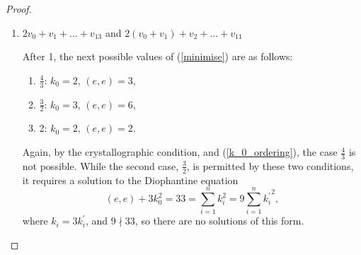 \documentclass[smallcondensed]{svjour3}                     %
\begin{document}
\begin{proof}
\begin{enumerate}
By the crystallographic condition, and (\ref{k_0_ordering}), the cases $\frac{1}{3}$ and $\frac{2}{3}$ are not possible. The second case, $\frac{1}{2}$, is realised by a solution to the Diophantine equation
\[(e, e) + 3 k_0^2 = 5 = \sum_{i=1}^n k_i^2,\]
where, by (\ref{k_0_ordering}) and (\ref{k_i_ordering}), all the $k_i$ must be bounded above by 1. Therefore this equation only has solutions in 5 or more dimensions, and produces
\begin{equation}\label{5dimensions}
v_0 + v_1 + v_2 + v_3 + v_4 + v_5.
\end{equation}

Now consider the final case in this list. This is realised by a solution to the Diophantine equation
\[(e, e) + 3 k_0^2 = 4 = \sum_{i=1}^n k_i^2,\]
where again, by (\ref{k_0_ordering}) and (\ref{k_i_ordering}), all the $k_i$ must be bounded above by 1. Therefore this equation has solutions in 4 or more dimensions, and produces
\begin{equation}\label{4dimensions}
v_0 + v_1 + v_2 + v_3 + v_4.
\end{equation}

A new vector is required in 4 dimensions to define an acute angled polyhedron of finite volume, and the vector (\ref{4dimensions}) is sufficient. In 5 or more dimensions the new vector must be taken to be (\ref{5dimensions}), as it has a smaller value of (\ref{minimise}). Note that as the inner product of (\ref{5dimensions}) and (\ref{4dimensions}) is positive, the two vectors are not mutually admissable.

In 5 or more dimensions, the additional constraint coming from $v_0 + v_1 + v_2 + v_3 + v_4 + v_5$ is:
\begin{equation} \label{3k_0gesum}
3 k_0 \ge k_1 + k_2 + k_3 + k_4 + k_5.
\end{equation}

\item $2 v_0 + v_1 + \ldots + v_{13}$ and $2( v_0 + v_1) + v_2 + \ldots + v_{11}$

After 1, the next possible values of (\ref{minimise}) are as follows:
\begin{enumerate}
\item $\frac{4}{3}$: $k_0 = 2$, $(e, e) = 3$, 
\item $\frac{3}{2}$: $k_0 = 3$, $(e, e) = 6$, 
\item 2: $k_0 = 2$, $(e, e) = 2$.
\end{enumerate}

Again, by the crystallographic condition, and (\ref{k_0_ordering}), the case $\frac{4}{3}$ is not possible. While the second case, $\frac{3}{2}$, is permitted by these two conditions, it requires a solution to the Diophantine equation
\[(e, e) + 3 k_0^2 = 33 = \sum_{i=1}^n k_i^2 = 9\sum_{i=1}^n {k_i^\prime}^2,\]
where $k_i = 3k_i^\prime$, and $9 \nmid 33$, so there are no solutions of this form.


\end{enumerate}
\end{proof}
\end{document}
